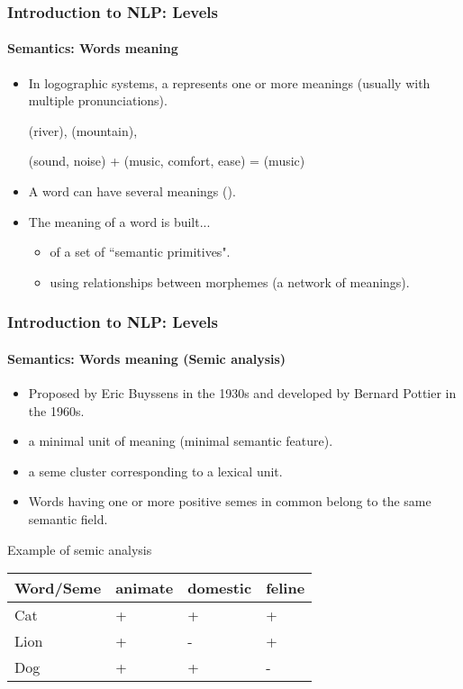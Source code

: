 \documentclass[xcolor=table]{beamer}
\begin{document}
\begin{frame}
\frametitle{Introduction to NLP: Levels}
\framesubtitle{Semantics: Words meaning}

\begin{itemize}
	\item In logographic systems, a  represents one or more meanings (usually with multiple pronunciations).
	
	\begin{CJK}{UTF8}{min}
		 (river),  (mountain), 
		
		 (sound, noise) +  (music, comfort, ease) =  (music)
	\end{CJK}

	\item A word can have several meanings ().
	\item The meaning of a word is built...
	\begin{itemize}
		\item of a set of ``semantic primitives".
		\item using relationships between morphemes (a network of meanings).
	\end{itemize}
\end{itemize}

\end{frame}


\begin{frame}
\frametitle{Introduction to NLP: Levels}
\framesubtitle{Semantics: Words meaning (Semic analysis)}

\begin{itemize}
	\item Proposed by Eric Buyssens in the 1930s and developed by Bernard Pottier in the 1960s.
	\item {} a minimal unit of meaning (minimal semantic feature).
	\item {} a seme cluster corresponding to a lexical unit.
	\item Words having one or more positive semes in common belong to the same semantic field.
\end{itemize}

\begin{exampleblock}{Example of semic analysis}
	\centering
	\begin{tabular}{|l|l|l|l|}
		\hline
		Word/Seme & animate & domestic & feline \\
		\hline
		Cat & + & + & + \\
		\hline
		Lion & + & - & + \\
		\hline
		Dog & + & + & - \\
		\hline
	\end{tabular}
\end{exampleblock}

\end{frame}
\end{document}
